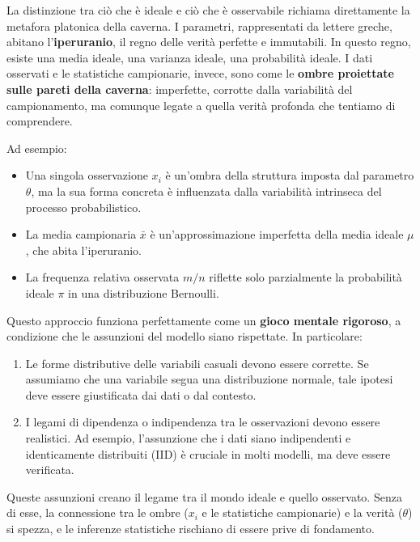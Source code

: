 \documentclass[
  11pt,
]{book}
\providecommand{\tightlist}{%
  \setlength{\itemsep}{0pt}\setlength{\parskip}{0pt}}
\theoremstyle{mytheoremstyle}
\theoremstyle{mydefstyle}
\begin{document}
La distinzione tra ciò che è ideale e ciò che è osservabile richiama direttamente la metafora platonica della caverna. I parametri, rappresentati da lettere greche, abitano l'\textbf{iperuranio}, il regno delle verità perfette e immutabili. In questo regno, esiste una media ideale, una varianza ideale, una probabilità ideale. I dati osservati e le statistiche campionarie, invece, sono come le \textbf{ombre proiettate sulle pareti della caverna}: imperfette, corrotte dalla variabilità del campionamento, ma comunque legate a quella verità profonda che tentiamo di comprendere.

Ad esempio:

\begin{itemize}
\tightlist
\item
  Una singola osservazione \(x_i\) è un'ombra della struttura imposta dal parametro \(\theta\), ma la sua forma concreta è influenzata dalla variabilità intrinseca del processo probabilistico.
\item
  La media campionaria \(\bar{x}\) è un'approssimazione imperfetta della media ideale \(\mu\), che abita l'iperuranio.
\item
  La frequenza relativa osservata \(m/n\) riflette solo parzialmente la probabilità ideale \(\pi\) in una distribuzione Bernoulli.
\end{itemize}

Questo approccio funziona perfettamente come un \textbf{gioco mentale rigoroso}, a condizione che le assunzioni del modello siano rispettate. In particolare:

\begin{enumerate}
\def\labelenumi{\arabic{enumi}.}
\tightlist
\item
  Le forme distributive delle variabili casuali devono essere corrette. Se assumiamo che una variabile segua una distribuzione normale, tale ipotesi deve essere giustificata dai dati o dal contesto.
\item
  I legami di dipendenza o indipendenza tra le osservazioni devono essere realistici. Ad esempio, l'assunzione che i dati siano indipendenti e identicamente distribuiti (IID) è cruciale in molti modelli, ma deve essere verificata.
\end{enumerate}

Queste assunzioni creano il legame tra il mondo ideale e quello osservato. Senza di esse, la connessione tra le ombre (\(x_i\) e le statistiche campionarie) e la verità (\(\theta\)) si spezza, e le inferenze statistiche rischiano di essere prive di fondamento.
\end{document}
